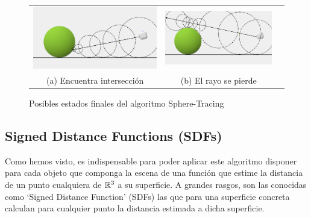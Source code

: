 \begin{figure}[ht]
    \centering
    \begin{tabular}{ccc}
      \includegraphics[scale=0.2]{img/C8/sphere-tracing-final.png} &     \includegraphics[scale=0.197]{img/C8/sphere-tracing-miss.png} \\
    (a) Encuentra intersección & (b) El rayo se pierde \\[6pt]
    \end{tabular}
    \caption{Posibles estados finales del algoritmo Sphere-Tracing}
    \label{fig:finales}
\end{figure}

\subsection{Signed Distance Functions (SDFs)}
\label{subsection:SDFs}

Como hemos visto, es indispensable para poder aplicar este algoritmo disponer para cada objeto que componga la escena de una función que estime la distancia de un punto cualquiera de $\R^3$ a su superficie. A grandes rasgos, son las conocidas como `Signed Distance Function' (SDFs) las que para una superficie concreta calculan para cualquier punto la distancia estimada a dicha superficie.

